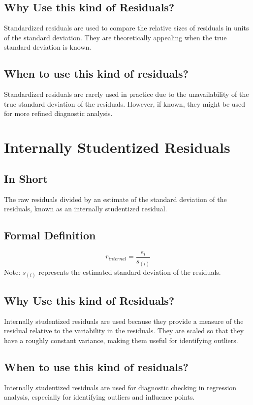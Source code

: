 \documentclass{article}
\begin{document}
\subsection{Why Use this kind of Residuals?}
Standardized residuals are used to compare the relative sizes of residuals in units of the standard deviation. They are theoretically appealing when the true standard deviation is known.

\subsection{When to use this kind of residuals?}
Standardized residuals are rarely used in practice due to the unavailability of the true standard deviation of the residuals. However, if known, they might be used for more refined diagnostic analysis.

\section{Internally Studentized Residuals}
\subsection{In Short}
The raw residuals divided by an estimate of the standard deviation of the residuals, known as an internally studentized residual.

\subsection{Formal Definition}
\[ r_{internal} = \frac{e_i}{s_{(i)}} \]
Note: \(s_{(i)}\) represents the estimated standard deviation of the residuals.

\subsection{Why Use this kind of Residuals?}
Internally studentized residuals are used because they provide a measure of the residual relative to the variability in the residuals. They are scaled so that they have a roughly constant variance, making them useful for identifying outliers.

\subsection{When to use this kind of residuals?}
Internally studentized residuals are used for diagnostic checking in regression analysis, especially for identifying outliers and influence points.
\end{document}
